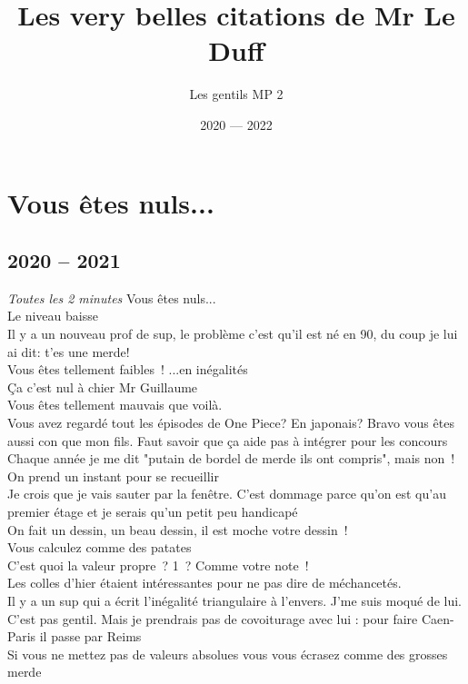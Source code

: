 \documentclass[french, a4paper, openany]{book}
\title{\huge{\sc Les very belles citations de Mr Le Duff}}
\author{\LARGE{Les gentils MP 2}}
\date{\Large{2020 — 2022}}
\begin{document}
 \maketitle

\section*{Vous êtes nuls...}

	\subsection*{2020 -- 2021}
		\noindent \emph{Toutes les 2 minutes} \og Vous êtes nuls... \fg \\
		\og Le niveau baisse \fg \\
		\og Il y a un nouveau prof de sup, le problème c'est qu'il est né en 90, du coup je lui ai dit: t'es une merde! \fg \\
		\og Vous êtes tellement faibles~! ...en inégalités \fg \\
		\og Ça c'est nul à chier Mr Guillaume \fg \\
		\og Vous êtes tellement mauvais que voilà. \fg \\
		\og Vous avez regardé tout les épisodes de One Piece? En japonais? Bravo vous êtes aussi con que mon fils. Faut savoir que ça aide pas à intégrer pour les concours \fg \\
		\og Chaque année je me dit "putain de bordel de merde ils ont compris", mais non~! \fg \\
		\og On prend un instant pour se recueillir \fg \\
		\og Je crois que je vais sauter par la fenêtre. C'est dommage parce qu'on est qu'au premier étage et je serais qu'un petit peu handicapé \fg \\
		\og On fait un dessin, un beau dessin, il est moche votre dessin~! \fg \\
		\og Vous calculez comme des patates \fg \\
		\og C'est quoi la valeur propre~? 1~? Comme votre note~! \fg \\
		\og Les colles d'hier étaient intéressantes pour ne pas dire de méchancetés. \fg \\
		\og Il y a un sup qui a écrit l'inégalité triangulaire à l'envers. J'me suis moqué de lui. C'est pas gentil. Mais je prendrais pas de covoiturage avec lui : pour faire Caen-Paris il passe par Reims \fg \\
		\og Si vous ne mettez pas de valeurs absolues vous vous écrasez comme des grosses merde \fg \\
\end{document}
